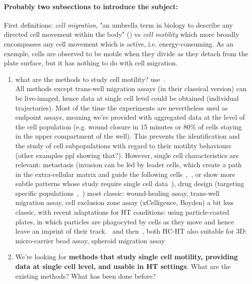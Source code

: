 \documentclass[12pt]{article}
\begin{document}
\paragraph{Probably two subsections to introduce the subject:\\} First definitions: \textit{cell migration}, "an umbrella term in biology to describe any directed cell movement within the body" (\cite{pmid22940039}) vs \textit{cell motility} which more broadly encompasses any cell movement which is active, i.e. energy-consuming. As an exemple, cells are observed to be motile when they divide as they detach from the plate surface, but it has nothing to do with cell migration.
\begin{enumerate}
\item what are the methods to study cell motility? use~\cite{pmid22940039}. \\All methods except trans-well migration assays (in their classical version) can be live-imaged, hence data at single cell level could be obtained (individual trajectories). Most of the time the experiments are nevertheless used as endpoint assays, meaning we're provided with aggregated data at the level of the cell population (e.g. wound closure in 15 minutes or 80\% of cells staying in the upper compartment of the well). This prevents the identification and the study of cell subpopulations with regard to their motility behaviours~\cite{pmid24324630} (other examples ppl showing that?). However, single cell characteristics are relevant: metastasis (invasion can be led by leader cells, which create a path in the extra-cellular matrix and guide the following cells~\cite{pmid18987875},~\cite{pmid11929834}, or show more subtle patterns whose study require single cell data~\cite{pmid25129619}), drug design (targeting specific populations~\cite{pmid15539606},~\cite{pmid20461076})
\subitem most classic: wound-healing assay, trans-well migration assay, cell exclusion zone assay (xCelligence, Boyden)
\subitem a bit less classic, with recent adaptations for HT conditions: using particle-coated plates, in which particles are phagocyted by cells as they move and hence leave an imprint of their track.~\cite{pmid329998} and then~\cite{pmid18213366}, both HC-HT
\subitem also suitable for 3D: micro-carrier bead assay, spheroid migration assay

\item We're looking for \textbf{methods that study single cell motility, providing data at single cell level, and usable in HT settings}. What are the existing methods? What has been done before?
\end{enumerate}
\end{document}
